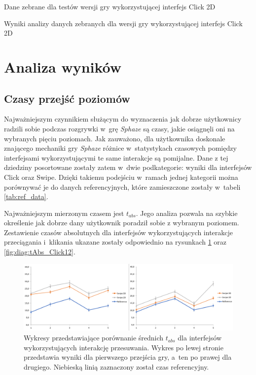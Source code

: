 \documentclass[a4paper,12pt,numbers=noenddot]{report}
\begin{document}
\begin{table}
  \caption{Dane zebrane dla testów wersji gry wykorzystującej interfejs Click 2D}
  \resizebox{\textwidth}{!}{%
	
  }
  \label{tab:results_Click2d}%
  \caption{Wyniki analizy danych zebranych dla wersji gry wykorzystującej interfejs Click 2D}
  \resizebox{\textwidth}{!}{%
	
  }
  \label{tab:analysis_Click2d}%
\end{table}%

\section{Analiza wyników}
\subsection{Czasy przejść poziomów}
Najważniejszym czynnikiem służącym do wyznaczenia jak dobrze użytkownicy radzili sobie podczas rozgrywki w~grę \textit{Sphaze} są czasy, jakie osiągnęli oni na wybranych pięciu poziomach. Jak zauważono, dla użytkownika doskonale znającego mechaniki gry \textit{Sphaze} różnice w~statystykach czasowych pomiędzy interfejsami wykorzystującymi te same interakcje są pomijalne. Dane z tej dziedziny posortowane zostały zatem w~dwie podkategorie: wyniki dla interfejsów Click oraz Swipe. Dzięki takiemu podejściu w~ramach jednej kategorii można porównywać je do danych referencyjnych, które zamieszczone zostały w~tabeli \ref{tab:ref_data}. 

Najważniejszym mierzonym czasem jest $t_{abs}$. Jego analiza pozwala na szybkie określenie jak dobrze dany użytkownik poradził sobie z wybranym poziomem. Zestawienie czasów absolutnych dla interfejsów wykorzystujących interakcje przeciągania i~klikania ukazane zostały odpowiednio na rysunkach \ref{fig:diag:tAbs_Swipe12} oraz \ref{fig:diag:tAbs_Click12}.

\begin{figure}[h!]
	\centering
  	\includegraphics[width=\linewidth]{diag/tAbs_Swipe12.png}
	\caption{Wykresy przedstawiające porównanie średnich $t_{abs}$ dla interfejsów wykorzystujących interakcję przesuwania. Wykres po lewej stronie przedstawia wyniki dla pierwszego przejścia gry, a~ten po prawej dla drugiego. Niebieską linią zaznaczony został czas referencyjny.}
	\label{fig:diag:tAbs_Swipe12}
\end{figure}
\end{document}
